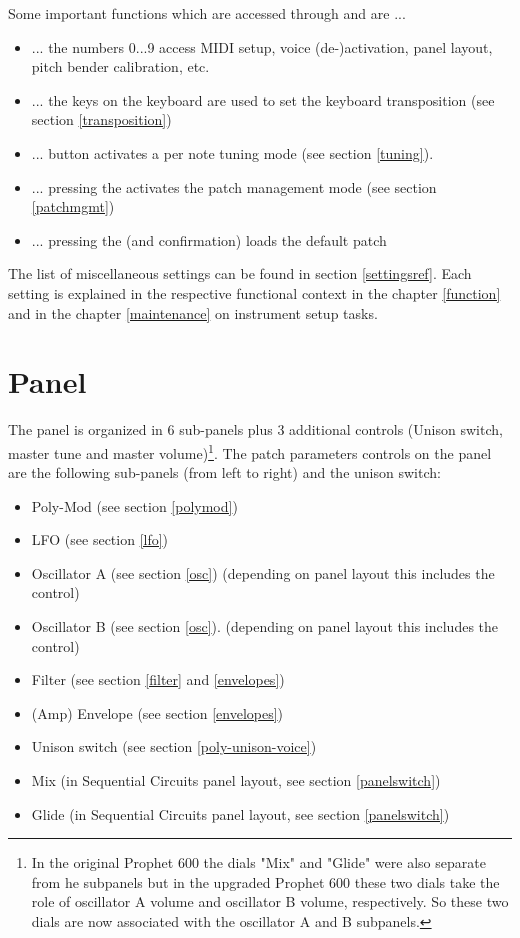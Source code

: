 \documentclass[landscape, 11pt, oneside]{report}
\newenvironment{flowtext}{\addmargin[0cm]{7cm}}{\endaddmargin} %
\begin{document}
\begin{flowtext}
Some important functions which are accessed through \shiftmode and \shiftlock are ...
\begin{itemize}
  \item ... the numbers 0...9 access MIDI setup, voice (de-)activation, panel layout, pitch bender calibration, etc. 
  \item ... the keys on the keyboard are used to set the keyboard transposition (see section \ref{transposition}) 
  \item ... \tune button activates a per note tuning mode (see section \ref{tuning}).
  \item ... pressing the \record activates the patch management mode (see section \ref{patchmgmt})
  \item ... pressing the \preset (and confirmation) loads the default patch
\end{itemize}

The list of miscellaneous settings can be found in section \ref{settingsref}. Each setting is explained in the respective functional context in the chapter \ref{function} and in the chapter \ref{maintenance} on instrument setup tasks.

\section{Panel}\label{panel}

The panel is organized in 6 sub-panels plus 3 additional controls (Unison switch, master tune and master volume)\footnote{In the original Prophet 600 the dials "Mix" and "Glide" were also separate from he subpanels but in the upgraded Prophet 600 these two dials take the role of oscillator A volume and oscillator B volume, respectively. So these two dials are now associated with the oscillator A and B subpanels.}. The patch parameters controls on the panel are the following sub-panels (from left to right) and the unison switch: 

\begin{itemize}
  \item Poly-Mod (see section \ref{polymod})
  \item LFO (see section \ref{lfo})
  \item Oscillator A (see section \ref{osc}) (depending on panel layout this includes the \vola control)
  \item Oscillator B (see section \ref{osc}). (depending on panel layout this includes the \volb control)
  \item Filter (see section \ref{filter} and \ref{envelopes}) 
  \item (Amp) Envelope (see section \ref{envelopes})
  \item Unison switch (see section \ref{poly-unison-voice})
  \item Mix (in Sequential Circuits panel layout, see section \ref{panelswitch})
  \item Glide (in Sequential Circuits panel layout, see section \ref{panelswitch})
  

\end{itemize}
\end{flowtext}
\end{document}
